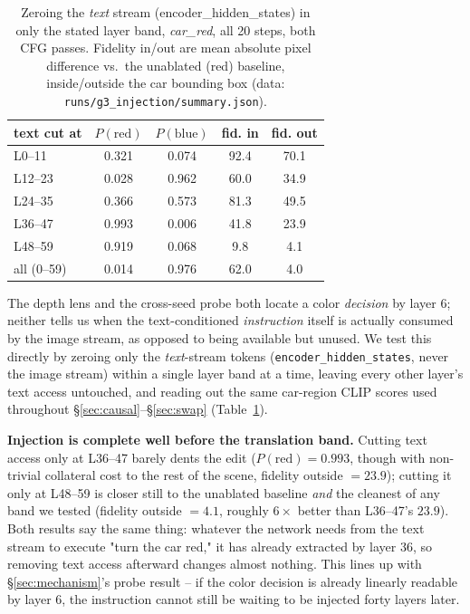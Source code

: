 \documentclass[10pt,twocolumn]{article}
\begin{document}
\begin{table}[t]
\centering
\small
\begin{tabular}{lcccc}
\toprule
text cut at & $P(\text{red})$ & $P(\text{blue})$ & fid. in & fid. out \\
\midrule
L0--11  & 0.321 & 0.074 & 92.4 & 70.1 \\
L12--23 & 0.028 & 0.962 & 60.0 & 34.9 \\
L24--35 & 0.366 & 0.573 & 81.3 & 49.5 \\
L36--47 & 0.993 & 0.006 & 41.8 & 23.9 \\
L48--59 & 0.919 & 0.068 &  9.8 &  4.1 \\
all (0--59) & 0.014 & 0.976 & 62.0 &  4.0 \\
\bottomrule
\end{tabular}
\caption{Zeroing the \emph{text} stream (encoder\_hidden\_states) in only
the stated layer band, \emph{car\_red}, all 20 steps, both CFG passes.
Fidelity in/out are mean absolute pixel difference vs.\ the unablated
(red) baseline, inside/outside the car bounding box (data:
\texttt{runs/g3\_injection/summary.json}).}
\label{tab:injection}
\end{table}

The depth lens and the cross-seed probe both locate a color \emph{decision}
by layer 6; neither tells us when the text-conditioned \emph{instruction}
itself is actually consumed by the image stream, as opposed to being
available but unused. We test this directly by zeroing only the
\emph{text}-stream tokens (\texttt{encoder\_hidden\_states}, never the
image stream) within a single layer band at a time, leaving every other
layer's text access untouched, and reading out the same car-region CLIP
scores used throughout \S\ref{sec:causal}--\S\ref{sec:swap}
(Table~\ref{tab:injection}).

\textbf{Injection is complete well before the translation band.} Cutting
text access only at L36--47 barely dents the edit ($P(\text{red})=0.993$,
though with non-trivial collateral cost to the rest of the scene, fidelity
outside $=23.9$); cutting it only at L48--59 is closer still to the
unablated baseline \emph{and} the cleanest of any band we tested
(fidelity outside $=4.1$, roughly $6\times$ better than L36--47's $23.9$).
Both results say the same thing: whatever the network needs from the text
stream to execute "turn the car red," it has already extracted by layer
36, so removing text access afterward changes almost nothing. This lines
up with \S\ref{sec:mechanism}'s probe result -- if the color decision is
already linearly readable by layer 6, the instruction cannot still be
waiting to be injected forty layers later.
\end{document}

